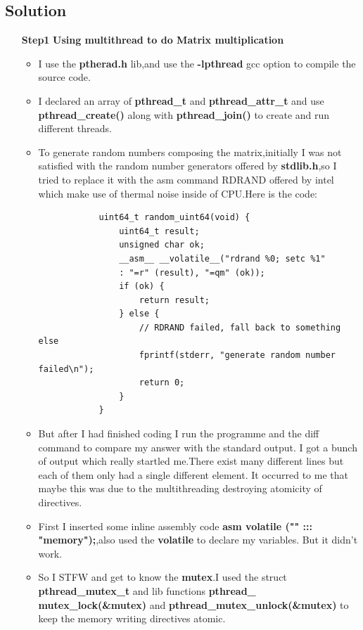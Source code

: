 \documentclass[]{article}
\begin{document}
\subsection*{Solution}
\begin{enumerate}
    \item[\textbf{Step1}] \textbf{Using multithread to do Matrix multiplication}
    \begin{itemize}
        \item I use the \textbf{ptherad.h} lib,and use the \textbf{-lpthread} gcc option to compile the source code.
        \item I declared an array of \textbf{pthread\_t} and \textbf{pthread\_attr\_t} and use \textbf{pthread\_create()} along with \textbf{pthread\_join()} to create and run different threads.
        \item To generate random numbers composing the matrix,initially I was not satisfied with the random number generators
        offered by \textbf{stdlib.h},so I tried to replace it with the asm command RDRAND offered by intel which make use of
        thermal noise inside of CPU.Here is the code:
        \begin{verbatim}
        	uint64_t random_uint64(void) {
        		uint64_t result;
        		unsigned char ok;
        		__asm__ __volatile__("rdrand %0; setc %1"
        		: "=r" (result), "=qm" (ok));
        		if (ok) {
        			return result;
        		} else {
        			// RDRAND failed, fall back to something else
        			fprintf(stderr, "generate random number failed\n");
        			return 0;
        		}
        	}
        \end{verbatim}
        \item But after I had finished coding I run the programme and the diff command to compare my answer with the standard output.
        I got a bunch of output which really startled me.There exist many different lines but each of them only had a single different element.
        It occurred to me that maybe this was due to the multithreading destroying atomicity of directives.\par 
        \item First I inserted some inline assembly code \textbf{asm volatile ("" ::: "memory");},also used the \textbf{volatile} to declare my variables.
        But it didn't work.
        \item So I STFW and get to know the \textbf{mutex}.I used the struct \textbf{pthread\_mutex\_t} and lib functions
        \textbf{pthread\_\\mutex\_lock(\&mutex)} and \textbf{pthread\_mutex\_unlock(\&mutex)} to keep the memory writing directives atomic.

\end{itemize}
\end{enumerate}
\end{document}
